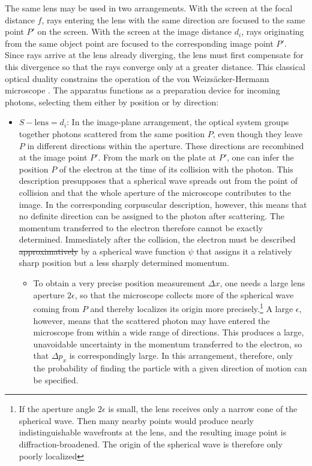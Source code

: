 \documentclass[pdflatex]{sn-jnl}
\newcommand{\vW}{von Weizsäcker\xspace}
\newcommand{\HW}{\vW-Hermann\xspace}
\newcommand{\pos}{\ensuremath{x}\xspace}
\newcommand{\mom}{\ensuremath{p_x}\xspace}
\providecommand{\DIFadd}[1]{{\protect\color{blue}\uwave{#1}}} %
\providecommand{\DIFdel}[1]{{\protect\color{red}\sout{#1}}}                      %
\providecommand{\DIFaddbegin}{} %
\providecommand{\DIFaddend}{} %
\providecommand{\DIFdelbegin}{} %
\providecommand{\DIFdelend}{} %
\begin{document}
\DIFdelend The same lens may be used in two arrangements. With the screen at the focal distance $f$, rays entering the lens with the same direction are focused to the same point $P'$ on the screen. With the screen at the image distance $d_i$, rays originating from the same object point are focused to the corresponding image point $P'$. Since rays arrive at the lens already diverging, the lens must first compensate for this divergence so that the rays converge only at a greater distance. This classical optical duality constrains the operation of the \HW microscope \citep[\S10]{Hermann1935}. The apparatus functions as a preparation device for incoming photons, selecting them either by position or by direction:
%
\begin{itemize}
\item $S-\text{lens}=d_i$: In the image-plane arrangement, the optical system groups together photons scattered from the same position $P$, even though they leave $P$ in different directions within the aperture. These directions are recombined at the image point $P'$. From the mark on the plate at $P'$, one can infer the position $P$ of the electron at the time of its collision with the photon. This description presupposes that a spherical wave spreads out from the point of collision and that the whole aperture of the microscope contributes to the image. In the corresponding corpuscular description, however, this means that no definite direction can be assigned to the photon after scattering. The momentum transferred to the electron therefore cannot be exactly determined. Immediately after the collision, the electron must be described \DIFdelbegin \DIFdel{approximatively }\DIFdelend \DIFaddbegin \DIFadd{approximately }\DIFaddend by a spherical wave function $\psi$ that assigns it a relatively sharp position but a less sharply determined momentum.
\DIFdelbegin %
\DIFdelend 

\begin{itemize}
\item To obtain a very precise position measurement $\Delta \pos$, one needs a large lens aperture $2\epsilon$, so that the microscope collects more of the spherical wave coming from $P$ and thereby localizes its origin more precisely.\footnote{If the aperture angle $2\epsilon$ is small, the lens receives only a narrow cone of the spherical wave. Then many nearby points would produce nearly indistinguishable wavefronts at the lens, and the resulting image point is diffraction-broadened. The origin of the spherical wave is therefore only poorly localized\DIFaddbegin \DIFadd{.}\DIFaddend } A large $\epsilon$, however, means that the scattered photon may have entered the microscope from within a wide range of directions. This produces a large, unavoidable uncertainty in the momentum transferred to the electron, so that $\Delta \mom$ is correspondingly large. In this arrangement, therefore, only the probability of finding the particle with a given direction of motion can be specified.
\end{itemize}


\end{itemize}
\end{document}
